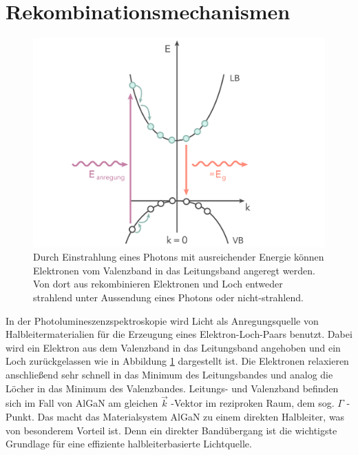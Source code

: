 
\thispagestyle{fancy}


\section{Rekombinationsmechanismen}
%
\begin{figure}[h]
\centering
\begin{minipage}[t]{1\linewidth}
\centering
\includegraphics[width=0.8\linewidth]{Bilder/bandrekomb.png}
\end{minipage}%
\caption{Durch Einstrahlung eines Photons mit ausreichender Energie können Elektronen vom Valenzband in das Leitungsband angeregt werden. Von dort aus rekombinieren Elektronen und Loch entweder strahlend unter Aussendung eines Photons oder nicht-strahlend.}
 \label{fig:bandrekomb}
\end{figure}
\noindent
In der Photolumineszenzspektroskopie wird Licht als Anregungsquelle von Halbleitermaterialien für die Erzeugung eines Elektron-Loch-Paars benutzt. Dabei wird ein Elektron aus dem Valenzband in das Leitungsband angehoben und ein Loch zurückgelassen wie in Abbildung \ref{fig:bandrekomb} dargestellt ist. Die Elektronen relaxieren anschließend sehr schnell in das Minimum des Leitungsbandes und analog die Löcher in das Minimum des Valenzbandes. 
\newline
Leitungs- und Valenzband befinden sich im Fall von AlGaN am gleichen $\vec{k}$ -Vektor im reziproken Raum, dem sog. $\Gamma$ -Punkt. Das macht das Materialsystem AlGaN zu einem direkten Halbleiter, was von besonderem Vorteil ist. Denn ein direkter Bandübergang ist die wichtigste Grundlage für eine effiziente halbleiterbasierte Lichtquelle. 
